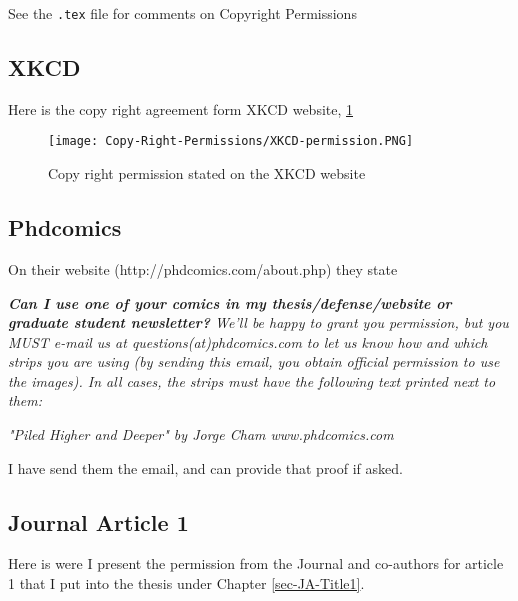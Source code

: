 


See the \verb+.tex+ file for comments on Copyright Permissions

\subsection{XKCD}

Here is the copy right agreement form XKCD website, \ref{fig:CR-XKCD}
\begin{figure}
    \centering
    \texttt{[image: Copy-Right-Permissions/XKCD-permission.PNG]}
    \caption{Copy right permission stated on the XKCD website}
    \label{fig:CR-XKCD}
\end{figure}

\subsection{Phdcomics}

On their website (http://phdcomics.com/about.php) they state

\textit{\textbf{Can I use one of your comics in my thesis/defense/website or graduate student newsletter?}
    We'll be happy to grant you permission, but you MUST e-mail us at questions(at)phdcomics.com to let us know how and which strips you are using (by sending this email, you obtain official permission to use the images). In all cases, the strips must have the following text printed next to them:}

\textit{	"Piled Higher and Deeper" by Jorge Cham www.phdcomics.com}

I have send them the email, and can  provide that proof if asked.

\subsection{Journal Article 1}

Here is were I present the permission from the Journal and co-authors for article 1 that I put into the thesis under Chapter \ref{sec-JA-Title1}.

